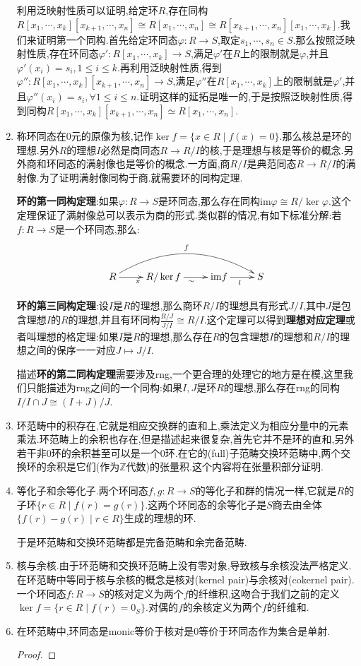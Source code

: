 \begin{enumerate}
	利用泛映射性质可以证明,给定环$R$,存在同构$R[x_1,\cdots,x_k][x_{k+1},\cdots,x_n]\cong R[x_1,\cdots,x_n]\cong R[x_{k+1},\cdots,x_n][x_1,\cdots,x_k]$.我们来证明第一个同构.首先给定环同态$\varphi:R\to S$,取定$s_1,\cdots,s_n\in S$.那么按照泛映射性质,存在环同态$\varphi':R[x_1,\cdots,x_k]\to S$,满足$\varphi'$在$R$上的限制就是$\varphi$,并且$\varphi'(x_i)=s_i,1\le i\le k$.再利用泛映射性质,得到$\varphi'':R[x_1,\cdots,x_k][x_{k+1},\cdots,x_n]\to S$,满足$\varphi''$在$R[x_1,\cdots,x_k]$上的限制就是$\varphi'$,并且$\varphi''(x_i)=s_i,\forall 1\le i\le n$.证明这样的延拓是唯一的,于是按照泛映射性质,得到同构$R[x_1,\cdots,x_k][x_{k+1},\cdots,x_n]\simeq R[x_1,\cdots,x_n]$.
	\item 称环同态在0元的原像为核,记作$\ker f=\{x\in R\mid f(x)=0\}$.那么核总是环的理想.另外$R$的理想$I$必然是商同态$R\to R/I$的核,于是理想与核是等价的概念.另外商和环同态的满射像也是等价的概念.一方面,商$R/I$是典范同态$R\to R/I$的满射像.为了证明满射像同构于商.就需要环的同构定理.
	
	\textbf{环的第一同构定理}:如果$\varphi:R\to S$是环同态,那么存在同构$\mathrm{im}\varphi\cong R/\ker\varphi$.这个定理保证了满射像总可以表示为商的形式.类似群的情况,有如下标准分解:若$f:R\to S$是一个环同态,那么:
	$$\xymatrix{
		R\ar[r]_{\pi}\ar@/^2pc/[rrr]^{f}&R/\ker f\ar[r]_{\sim}&\mathrm{im}f\ar[r]_l&S
	}$$
	
	\textbf{环的第三同构定理}:设$I$是$R$的理想,那么商环$R/I$的理想具有形式$J/I$,其中$J$是包含理想$I$的$R$的理想,并且有环同构$\frac{R/J}{J/I}\cong R/I$.这个定理可以得到\textbf{理想对应定理}或者叫理想的格定理:如果$I$是$R$的理想,那么存在$R$的包含理想$I$的理想和$R/I$的理想之间的保序一一对应$J\mapsto J/I$.
	
	描述\textbf{环的第二同构定理}需要涉及rng,一个更合理的处理它的地方是在模,这里我们只能描述为rng之间的一个同构:如果$I,J$是环$R$的理想,那么存在rng的同构$I/I\cap J\cong (I+J)/J$.
	\item 环范畴中的积存在,它就是相应交换群的直和上,乘法定义为相应分量中的元素乘法.环范畴上的余积也存在,但是描述起来很复杂,首先它并不是环的直和,另外若干非0环的余积甚至可以是一个0环.在它的(full)子范畴交换环范畴中,两个交换环的余积是它们(作为$\mathbb{Z}$代数)的张量积.这个内容将在张量积部分证明.
	\item 等化子和余等化子.两个环同态$f,g:R\to S$的等化子和群的情况一样,它就是$R$的子环$\{r\in R\mid f(r)=g(r)\}$.这两个环同态的余等化子是$S$商去由全体$\{f(r)-g(r)\mid r\in R\}$生成的理想的环.
	
	于是环范畴和交换环范畴都是完备范畴和余完备范畴.
	\item 核与余核.由于环范畴和交换环范畴上没有零对象,导致核与余核没法严格定义.在环范畴中等同于核与余核的概念是核对(kernel pair)与余核对(cokernel pair).一个环同态$f:R\to S$的核对定义为两个$f$的纤维积,这吻合于我们之前的定义$\ker f=\{r\in R\mid f(r)=0_S\}$.对偶的$f$的余核定义为两个$f$的纤维和.
	\item 在环范畴中,环同态是monic等价于核对是${0}$等价于环同态作为集合是单射.
	\begin{proof}
		

\end{proof}
\end{enumerate}
